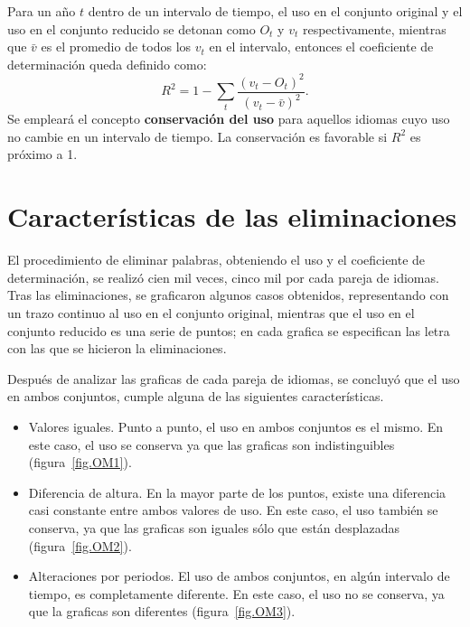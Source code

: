 Para un año $t$ dentro de un intervalo de tiempo,  el uso en el conjunto original y el uso en el conjunto reducido se detonan como $O_{t}$ y $v_{t}$ respectivamente,  mientras que $\bar{v}$ es el promedio de todos los $v_{t}$ en el intervalo, entonces el coeficiente de determinación queda definido como: 
\begin{equation}
\label{ec.dif_uso}
R^{2} = 1 - \sum_{t} \frac{ \left( v_{t}- O_{t} \right)^{2}  }{ \left( v_{t} - \bar{v} \right)^{2} }.
\end{equation}
Se empleará el concepto \textbf{conservación del uso} para aquellos idiomas cuyo uso no cambie en un intervalo de tiempo. La conservación es favorable si $R^{2}$ es próximo a 1. 

\section{Características de las eliminaciones}


El procedimiento de eliminar palabras, obteniendo el uso y el coeficiente de determinación, se realizó cien mil veces, cinco mil por cada pareja de idiomas. Tras las eliminaciones, se graficaron algunos casos obtenidos, representando con un trazo continuo al uso en el conjunto original, mientras que el uso en el conjunto reducido es una serie de puntos; en cada grafica se especifican las letra con las que se hicieron la eliminaciones. 

Después de analizar las graficas de cada pareja de idiomas, se concluyó  que el uso en ambos conjuntos, cumple alguna de las siguientes características.


\begin{itemize}
	
	\item Valores iguales. Punto a punto, el uso en ambos conjuntos es el mismo. En este caso, el uso se conserva ya que las graficas son indistinguibles (figura~\ref{fig.OM1}).
	
	\item Diferencia de altura. En la mayor parte de los puntos, existe una diferencia casi constante entre ambos valores de uso. En este caso, el uso también se conserva, ya que las graficas son iguales sólo que están desplazadas (figura~\ref{fig.OM2}).  
	
	\item Alteraciones por periodos. El uso de ambos conjuntos,  en algún intervalo de tiempo, es completamente diferente. En este caso, el uso no se conserva, ya que la graficas son diferentes (figura~\ref{fig.OM3}).

\end{itemize}



